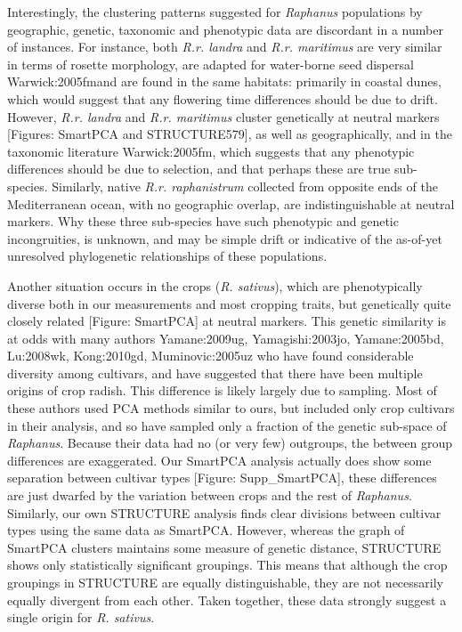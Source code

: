 \documentclass[twocolumn]{bmcart}%
\begin{document}
Interestingly, the clustering patterns suggested for \textit{Raphanus} populations by geographic, genetic, taxonomic and phenotypic data are discordant in a number of instances. For instance, both \textit{R.r. landra} and \textit{R.r. maritimus} are very similar in terms of rosette morphology, are adapted for water-borne seed dispersal {Warwick:2005fm}and are found in the same habitats: primarily in coastal dunes, which would suggest that any flowering time differences should be due to drift. However, \textit{R.r. landra} and \textit{R.r. maritimus} cluster genetically at neutral markers [Figures: SmartPCA and STRUCTURE579], as well as geographically, and in the taxonomic literature {Warwick:2005fm}, which suggests that any phenotypic differences should be due to selection, and that perhaps these are true sub-species. Similarly, native \textit{R.r. raphanistrum} collected from opposite ends of the Mediterranean ocean, with no geographic overlap, are indistinguishable at neutral markers. Why these three sub-species have such phenotypic and genetic incongruities, is unknown, and may be simple drift or indicative of the as-of-yet unresolved phylogenetic relationships of these populations. 

Another situation occurs in the crops (\textit{R. sativus}), which are phenotypically diverse both in our measurements and most cropping traits, but genetically quite closely related [Figure: SmartPCA] at neutral markers. This genetic similarity is at odds with many authors {Yamane:2009ug, Yamagishi:2003jo, Yamane:2005bd, Lu:2008wk, Kong:2010gd, Muminovic:2005uz } who have found considerable diversity among cultivars, and have suggested that there have been multiple origins of crop radish. This difference is likely largely due to sampling. Most of these authors used PCA methods similar to ours, but included only crop cultivars in their analysis, and so have sampled only a fraction of the genetic sub-space of \textit{Raphanus}. Because their data had no (or very few) outgroups, the between group differences are exaggerated. Our SmartPCA analysis actually does show some separation between cultivar types [Figure: Supp\_SmartPCA], these differences are just dwarfed by the variation between crops and the rest of \textit{Raphanus}. Similarly, our own STRUCTURE analysis finds clear divisions between cultivar types using the same data as SmartPCA. However, whereas the graph of SmartPCA clusters maintains some measure of genetic distance, STRUCTURE shows only statistically significant groupings. This means that although the crop groupings in STRUCTURE are equally distinguishable, they are not necessarily equally divergent from each other. Taken together, these data strongly suggest a single origin for \textit{R. sativus}.
\end{document}
